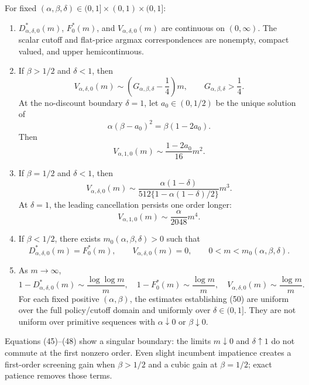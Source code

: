 \documentclass[mnsc,dblanonrev]{informs4}
\begin{document}
\begin{theorem}
\label{thm:thickness}
For fixed $(\alpha,\beta,\delta)\in(0,1]\times(0,1)\times(0,1]$:
\begin{enumerate}[label=(\roman*)]
 \item $D_{\alpha,\delta,0}^*(m)$, $F_0^*(m)$, and
 $V_{\alpha,\delta,0}(m)$ are continuous on $(0,\infty)$.  The scalar
 cutoff and flat-price argmax correspondences are nonempty, compact valued,
 and upper hemicontinuous.

 \item If $\beta>1/2$ and $\delta<1$, then
 \[
  V_{\alpha,\delta,0}(m)
  \sim\left(G_{\alpha,\beta,\delta}-\frac14\right)m,
  \qquad G_{\alpha,\beta,\delta}>\frac14.                 \tag{45}
 \]
 At the no-discount boundary $\delta=1$, let $a_0\in(0,1/2)$ be the
 unique solution of
 \[
  \alpha(\beta-a_0)^2=\beta(1-2a_0).
 \]
 Then
 \[
  V_{\alpha,1,0}(m)\sim\frac{1-2a_0}{16}m^2.              \tag{46}
 \]

 \item If $\beta=1/2$ and $\delta<1$, then
 \[
  V_{\alpha,\delta,0}(m)
  \sim
  \frac{\alpha(1-\delta)}
  {512\{1-\alpha(1-\delta)/2\}}m^3.                       \tag{47}
 \]
 At $\delta=1$, the leading cancellation persists one order longer:
 \[
  V_{\alpha,1,0}(m)\sim\frac{\alpha}{2048}m^4.            \tag{48}
 \]

 \item If $\beta<1/2$, there exists
 $m_0(\alpha,\beta,\delta)>0$ such that
 \[
  D_{\alpha,\delta,0}^*(m)=F_0^*(m),\qquad
  V_{\alpha,\delta,0}(m)=0,
  \qquad 0<m<m_0(\alpha,\beta,\delta).                   \tag{49}
 \]

 \item As $m\to\infty$,
 \[
  1-D_{\alpha,\delta,0}^*(m)\sim\frac{\log\log m}{m},
  \quad 1-F_0^*(m)\sim\frac{\log m}{m},
  \quad V_{\alpha,\delta,0}(m)\sim\frac{\log m}{m}.     \tag{50}
 \]
 For each fixed positive $(\alpha,\beta)$, the estimates establishing (50)
 are uniform over the full policy/cutoff domain and uniformly over
 $\delta\in(0,1]$.  They are not uniform over primitive sequences with
 $\alpha\downarrow0$ or $\beta\downarrow0$.
\end{enumerate}
\end{theorem}

Equations (45)--(48) show a singular boundary: the limits $m\downarrow0$ and
$\delta\uparrow1$ do not commute at the first nonzero order.  Even slight
incumbent impatience creates a first-order screening gain when $\beta>1/2$
and a cubic gain at $\beta=1/2$; exact patience removes those terms.
\end{document}
